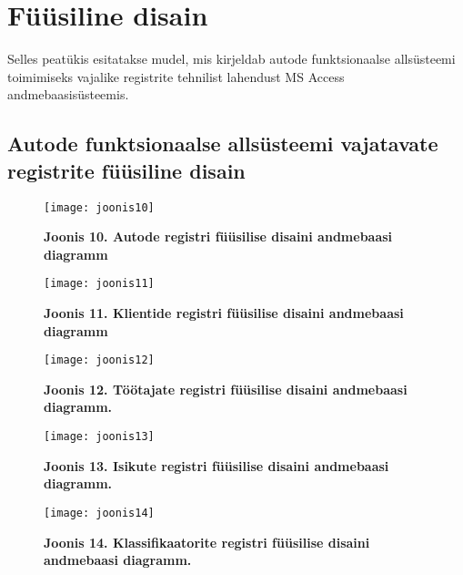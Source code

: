 \chapter{Füüsiline disain}
Selles peatükis esitatakse mudel, mis kirjeldab autode funktsionaalse allsüsteemi toimimiseks vajalike registrite tehnilist lahendust MS Access andmebaasisüsteemis.
\section{Autode funktsionaalse allsüsteemi vajatavate registrite füüsiline disain}

\begin{figure}[H]
	\texttt{[image: joonis10]}
	\caption{\textbf{Joonis 10. Autode registri füüsilise disaini andmebaasi diagramm}}
\end{figure}

\begin{figure}[H]
	\texttt{[image: joonis11]}
	\caption{\textbf{Joonis 11. Klientide registri füüsilise disaini andmebaasi diagramm}}
\end{figure}
	
\begin{figure}[H]
	\texttt{[image: joonis12]}
	\caption{\textbf{Joonis 12. Töötajate registri füüsilise disaini andmebaasi diagramm.}}
\end{figure}

\begin{figure}[H]
	\texttt{[image: joonis13]}
	\caption{\textbf{Joonis 13. Isikute registri füüsilise disaini andmebaasi diagramm.}}
\end{figure}

\begin{figure}[H]
	\texttt{[image: joonis14]}
	\caption{\textbf{Joonis 14. Klassifikaatorite registri füüsilise disaini andmebaasi diagramm.}}
\end{figure}